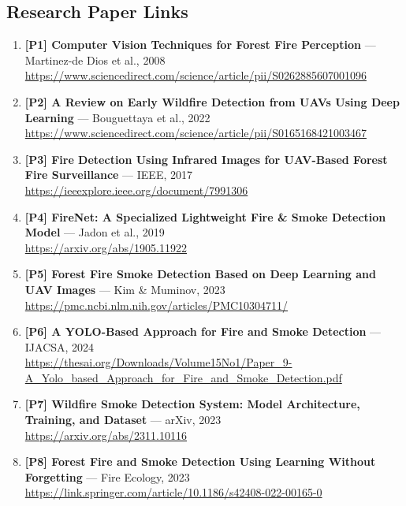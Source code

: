 \documentclass[11pt,twocolumn]{article}
\begin{document}
\subsection*{Research Paper Links}

\begin{enumerate}[leftmargin=*, itemsep=4pt]

    \item \textbf{[P1] Computer Vision Techniques for Forest Fire
          Perception} --- Martinez-de Dios et al., 2008\\
          \url{https://www.sciencedirect.com/science/article/pii/S0262885607001096}

    \item \textbf{[P2] A Review on Early Wildfire Detection from UAVs
          Using Deep Learning} --- Bouguettaya et al., 2022\\
          \url{https://www.sciencedirect.com/science/article/pii/S0165168421003467}

    \item \textbf{[P3] Fire Detection Using Infrared Images for
          UAV-Based Forest Fire Surveillance} --- IEEE, 2017\\
          \url{https://ieeexplore.ieee.org/document/7991306}

    \item \textbf{[P4] FireNet: A Specialized Lightweight Fire \&
          Smoke Detection Model} --- Jadon et al., 2019\\
          \url{https://arxiv.org/abs/1905.11922}

    \item \textbf{[P5] Forest Fire Smoke Detection Based on Deep
          Learning and UAV Images} --- Kim \& Muminov, 2023\\
          \url{https://pmc.ncbi.nlm.nih.gov/articles/PMC10304711/}

    \item \textbf{[P6] A YOLO-Based Approach for Fire and Smoke
          Detection} --- IJACSA, 2024\\
          \url{https://thesai.org/Downloads/Volume15No1/Paper_9-A_Yolo_based_Approach_for_Fire_and_Smoke_Detection.pdf}

    \item \textbf{[P7] Wildfire Smoke Detection System: Model
          Architecture, Training, and Dataset} --- arXiv, 2023\\
          \url{https://arxiv.org/abs/2311.10116}

    \item \textbf{[P8] Forest Fire and Smoke Detection Using Learning
          Without Forgetting} --- Fire Ecology, 2023\\
          \url{https://link.springer.com/article/10.1186/s42408-022-00165-0}


\end{enumerate}
\end{document}
